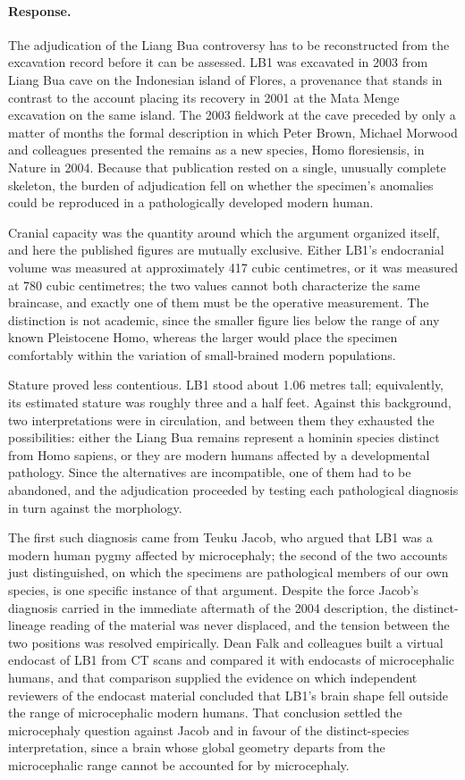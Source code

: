 \documentclass[11pt]{article}
\begin{document}
\paragraph{Response.} {\small The adjudication of the Liang Bua controversy has to be reconstructed from the excavation record before it can be assessed. LB1 was excavated in 2003 from Liang Bua cave on the Indonesian island of Flores, a provenance that stands in contrast to the account placing its recovery in 2001 at the Mata Menge excavation on the same island. The 2003 fieldwork at the cave preceded by only a matter of months the formal description in which Peter Brown, Michael Morwood and colleagues presented the remains as a new species, Homo floresiensis, in Nature in 2004. Because that publication rested on a single, unusually complete skeleton, the burden of adjudication fell on whether the specimen's anomalies could be reproduced in a pathologically developed modern human.

Cranial capacity was the quantity around which the argument organized itself, and here the published figures are mutually exclusive. Either LB1's endocranial volume was measured at approximately 417 cubic centimetres, or it was measured at 780 cubic centimetres; the two values cannot both characterize the same braincase, and exactly one of them must be the operative measurement. The distinction is not academic, since the smaller figure lies below the range of any known Pleistocene Homo, whereas the larger would place the specimen comfortably within the variation of small-brained modern populations.

Stature proved less contentious. LB1 stood about 1.06 metres tall; equivalently, its estimated stature was roughly three and a half feet. Against this background, two interpretations were in circulation, and between them they exhausted the possibilities: either the Liang Bua remains represent a hominin species distinct from Homo sapiens, or they are modern humans affected by a developmental pathology. Since the alternatives are incompatible, one of them had to be abandoned, and the adjudication proceeded by testing each pathological diagnosis in turn against the morphology.

The first such diagnosis came from Teuku Jacob, who argued that LB1 was a modern human pygmy affected by microcephaly; the second of the two accounts just distinguished, on which the specimens are pathological members of our own species, is one specific instance of that argument. Despite the force Jacob's diagnosis carried in the immediate aftermath of the 2004 description, the distinct-lineage reading of the material was never displaced, and the tension between the two positions was resolved empirically. Dean Falk and colleagues built a virtual endocast of LB1 from CT scans and compared it with endocasts of microcephalic humans, and that comparison supplied the evidence on which independent reviewers of the endocast material concluded that LB1's brain shape fell outside the range of microcephalic modern humans. That conclusion settled the microcephaly question against Jacob and in favour of the distinct-species interpretation, since a brain whose global geometry departs from the microcephalic range cannot be accounted for by microcephaly.

}
\end{document}
